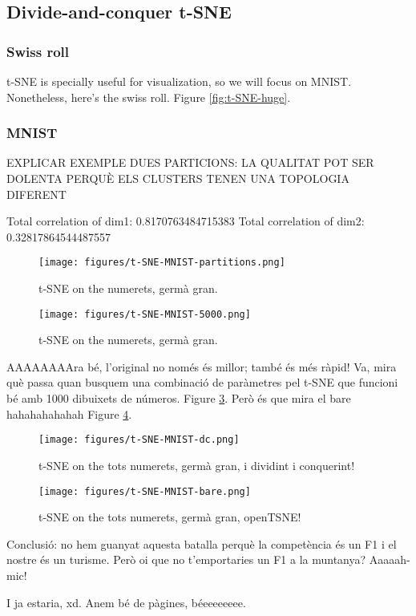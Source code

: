 \subsection{Divide-and-conquer t-SNE}

\subsubsection{Swiss roll}

t-SNE is specially useful for visualization, so we will focus on MNIST. Nonetheless, here's the swiss roll. Figure \ref{fig:t-SNE-huge}.

\subsubsection{MNIST}

EXPLICAR EXEMPLE DUES PARTICIONS: LA QUALITAT POT SER DOLENTA PERQUÈ ELS CLUSTERS TENEN UNA TOPOLOGIA DIFERENT

Total correlation of dim1: 0.8170763484715383
Total correlation of dim2: 0.32817864544487557

\begin{figure}[ht]
    \centering
    \texttt{[image: figures/t-SNE-MNIST-partitions.png]}
    \caption{t-SNE on the numerets, germà gran.}
    \label{fig:t-SNE-MNIST-partitions}
\end{figure}

\begin{figure}[ht]
    \centering
    \texttt{[image: figures/t-SNE-MNIST-5000.png]}
    \caption{t-SNE on the numerets, germà gran.}
    \label{fig:t-SNE-MNIST}
\end{figure}

AAAAAAAAra bé, l'original no només és millor; també és més ràpid! Va, mira què passa quan busquem una combinació de paràmetres pel t-SNE que funcioni bé amb 1000 dibuixets de números. Figure \ref{fig:t-SNE-MNIST-dc}. Però és que mira el bare hahahahahahah Figure \ref{fig:t-SNE-MNIST-bare}.

\begin{figure}[ht]
    \centering
    \texttt{[image: figures/t-SNE-MNIST-dc.png]}
    \caption{t-SNE on the tots numerets, germà gran, i dividint i conquerint!}
    \label{fig:t-SNE-MNIST-dc}
\end{figure}

\begin{figure}[ht]
    \centering
    \texttt{[image: figures/t-SNE-MNIST-bare.png]}
    \caption{t-SNE on the tots numerets, germà gran, openTSNE!}
    \label{fig:t-SNE-MNIST-bare}
\end{figure}

Conclusió: no hem guanyat aquesta batalla perquè la competència és un F1 i el nostre és un turisme. Però oi que no t'emportaries un F1 a la muntanya? Aaaaah-mic!

I ja estaria, xd. Anem bé de pàgines, béeeeeeeee.